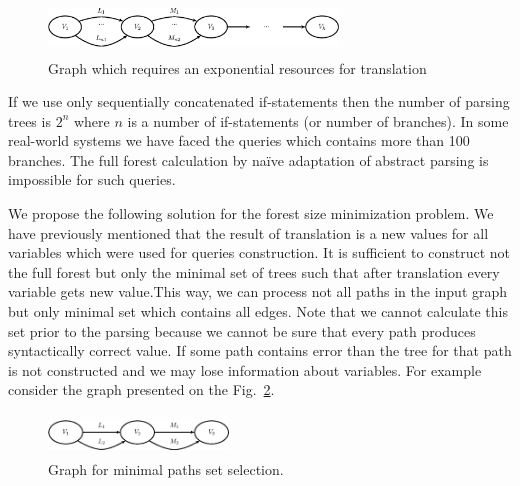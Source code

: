 \begin{figure}
    \begin{center}
        \includegraphics[width=7.7cm,height=1.4cm]{graphs/big_res.eps}
        \caption{Graph which requires an exponential resources for translation}
        \label{pic5}
    \end{center}
\end{figure}

If we use only sequentially concatenated if-statements then the number of parsing trees is $2^n$ 
where $n$ is a number of if-statements (or number of branches). In some real-world systems we 
have faced the queries which contains more than 100 branches. The full forest calculation by na\"ive 
adaptation of abstract parsing is impossible for such queries. 



We propose the following solution for the forest size minimization problem. We have previously mentioned 
that the result of translation is a new values for all variables which were used for queries construction. 
It is sufficient to construct not the full forest but only the minimal set of trees such that after 
translation every variable gets new value.This way, we can process not all paths in the input graph 
but only minimal set which contains all edges. Note that we cannot calculate this set prior to the parsing 
because we cannot be sure that every path produces syntactically correct value. If some path contains 
error than the tree for that path is not constructed and we may lose information about variables. 
For example consider the graph presented on the Fig.~\ref{pic6}.

\begin{figure}
    \begin{center}
        \includegraphics[width=4.8cm,height=1.1cm]{graphs/paths.eps}
        \caption{Graph for minimal paths set selection.}
        \label{pic6}
    \end{center}
\end{figure}

